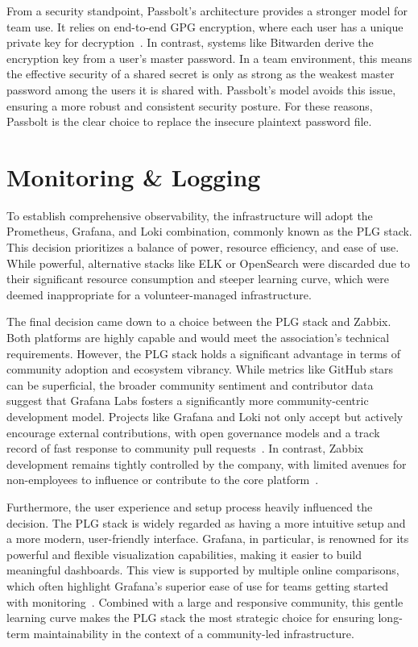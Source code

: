 From a security standpoint, Passbolt's architecture provides a stronger model for team use. It relies on end-to-end GPG encryption, where each user has a unique private key for decryption~\cite{passbolt-security}. In contrast, systems like Bitwarden derive the encryption key from a user's master password. In a team environment, this means the effective security of a shared secret is only as strong as the weakest master password among the users it is shared with. Passbolt's model avoids this issue, ensuring a more robust and consistent security posture. For these reasons, Passbolt is the clear choice to replace the insecure plaintext password file.

\section{Monitoring \& Logging}

To establish comprehensive observability, the infrastructure will adopt the Prometheus, Grafana, and Loki combination, commonly known as the PLG stack. This decision prioritizes a balance of power, resource efficiency, and ease of use. While powerful, alternative stacks like ELK or OpenSearch were discarded due to their significant resource consumption and steeper learning curve, which were deemed inappropriate for a volunteer-managed infrastructure.

The final decision came down to a choice between the PLG stack and Zabbix. Both platforms are highly capable and would meet the association's technical requirements. However, the PLG stack holds a significant advantage in terms of community adoption and ecosystem vibrancy. While metrics like GitHub stars can be superficial, the broader community sentiment and contributor data suggest that Grafana Labs fosters a significantly more community-centric development model. Projects like Grafana and Loki not only accept but actively encourage external contributions, with open governance models and a track record of fast response to community pull requests~\cite{collab-grafana}. In contrast, Zabbix development remains tightly controlled by the company, with limited avenues for non-employees to influence or contribute to the core platform~\cite{zabbix-dev-policy}.

Furthermore, the user experience and setup process heavily influenced the decision. The PLG stack is widely regarded as having a more intuitive setup and a more modern, user-friendly interface. Grafana, in particular, is renowned for its powerful and flexible visualization capabilities, making it easier to build meaningful dashboards. This view is supported by multiple online comparisons, which often highlight Grafana's superior ease of use for teams getting started with monitoring~\cite{squadcast-zabbix-grafana}. Combined with a large and responsive community, this gentle learning curve makes the PLG stack the most strategic choice for ensuring long-term maintainability in the context of a community-led infrastructure.

